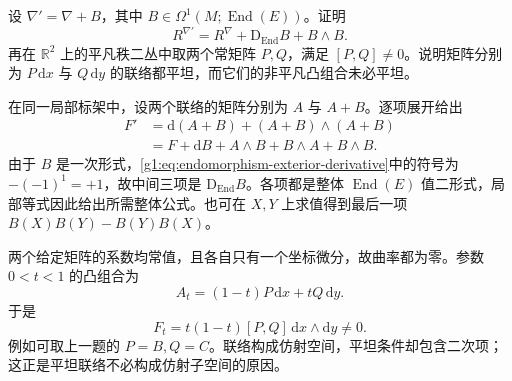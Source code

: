 \begin{exercise}\label{g1:ex:curvature-connection-difference}
	设 \(\nabla' =\nabla+B\)，其中 \(B\in\Omega^1(M;\operatorname{End}(E))\)。证明
	\[
		R^{\nabla'}=R^\nabla+\mathrm{D}_{\operatorname{End}}B+B\wedge B.
	\]
	再在 \(\mathbb R^2\) 上的平凡秩二丛中取两个常矩阵 \(P,Q\)，满足 \([P,Q]\ne0\)。说明矩阵分别为 \(P\,\mathrm{d}x\) 与 \(Q\,\mathrm{d}y\) 的联络都平坦，而它们的非平凡凸组合未必平坦。
\end{exercise}
\begin{solution}
	在同一局部标架中，设两个联络的矩阵分别为 \(A\) 与 \(A+B\)。逐项展开给出
	\begin{align*}
		F'&=\mathrm{d}(A+B)+(A+B)\wedge(A+B)\\
		&=F+\mathrm{d}B+A\wedge B+B\wedge A+B\wedge B.
	\end{align*}
	由于 \(B\) 是一次形式，\eqref{g1:eq:endomorphism-exterior-derivative}中的符号为 \(-(-1)^1=+1\)，故中间三项是 \(\mathrm{D}_{\operatorname{End}}B\)。各项都是整体 \(\operatorname{End}(E)\) 值二形式，局部等式因此给出所需整体公式。也可在 \(X,Y\) 上求值得到最后一项 \(B(X)B(Y)-B(Y)B(X)\)。

	两个给定矩阵的系数均常值，且各自只有一个坐标微分，故曲率都为零。参数 \(0<t<1\) 的凸组合为
	\[
		A_t=(1-t)P\,\mathrm{d}x+tQ\,\mathrm{d}y.
	\]
	于是
	\[
		F_t=t(1-t)[P,Q]\,\mathrm{d}x\wedge\mathrm{d}y\ne0.
	\]
	例如可取上一题的 \(P=B,Q=C\)。联络构成仿射空间，平坦条件却包含二次项；这正是平坦联络不必构成仿射子空间的原因。
\end{solution}

